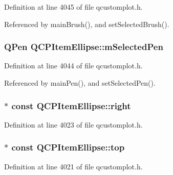 Definition at line 4045 of file qcustomplot.\+h.



Referenced by main\+Brush(), and set\+Selected\+Brush().

\hypertarget{class_q_c_p_item_ellipse_a57b047abfce6f1a84ed46ca668c90e21}{}
\subsubsection[{m\+Selected\+Pen}]{\setlength{\rightskip}{0pt plus 5cm}Q\+Pen Q\+C\+P\+Item\+Ellipse\+::m\+Selected\+Pen\hspace{0.3cm}{\ttfamily [protected]}}\label{class_q_c_p_item_ellipse_a57b047abfce6f1a84ed46ca668c90e21}


Definition at line 4044 of file qcustomplot.\+h.



Referenced by main\+Pen(), and set\+Selected\+Pen().

\hypertarget{class_q_c_p_item_ellipse_a50091a3bd8761d3ce0d95d9c727e4a82}{}
\subsubsection[{right}]{$\ast$ const Q\+C\+P\+Item\+Ellipse\+::right}\label{class_q_c_p_item_ellipse_a50091a3bd8761d3ce0d95d9c727e4a82}


Definition at line 4023 of file qcustomplot.\+h.

\hypertarget{class_q_c_p_item_ellipse_ad50f907d6f9d1402c6c5d302dca5c5d5}{}
\subsubsection[{top}]{$\ast$ const Q\+C\+P\+Item\+Ellipse\+::top}\label{class_q_c_p_item_ellipse_ad50f907d6f9d1402c6c5d302dca5c5d5}


Definition at line 4021 of file qcustomplot.\+h.

\hypertarget{class_q_c_p_item_ellipse_a12fd8420c06718d0c8a2303d6a652848}{}
